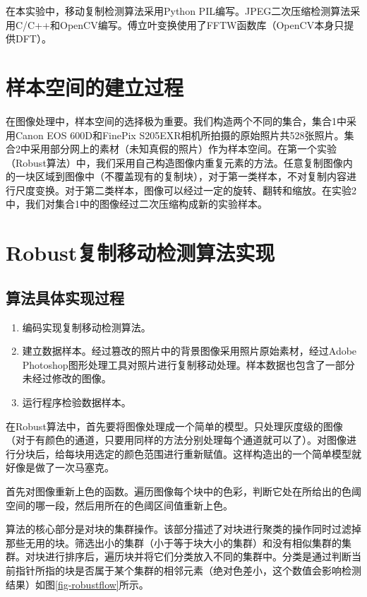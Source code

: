 \documentclass[a4paper, 10pt, notitlepage]{report}
\begin{document}
		在本实验中，移动复制检测算法采用Python PIL编写。JPEG二次压缩检测算法采用C/C++和OpenCV编写。傅立叶变换使用了FFTW函数库（OpenCV本身只提供DFT）。

	\section{样本空间的建立过程}
		在图像处理中，样本空间的选择极为重要。我们构造两个不同的集合，集合1中采用Canon EOS 600D和FinePix S205EXR相机所拍摄的原始照片共528张照片。集合2中采用部分网上的素材（未知真假的照片）作为样本空间。在第一个实验（Robust算法）中，我们采用自己构造图像内重复元素的方法。任意复制图像内的一块区域到图像中（不覆盖现有的复制块），对于第一类样本，不对复制内容进行尺度变换。对于第二类样本，图像可以经过一定的旋转、翻转和缩放。在实验2中，我们对集合1中的图像经过二次压缩构成新的实验样本。

	\section{Robust复制移动检测算法实现}
		\subsection{算法具体实现过程}
			\begin{enumerate}\setlength{\itemsep}{-0.1cm}
				\item 编码实现复制移动检测算法。
				\item 建立数据样本。经过篡改的照片中的背景图像采用照片原始素材，经过Adobe Photoshop图形处理工具对照片进行复制移动处理。样本数据也包含了一部分未经过修改的图像。
				\item 运行程序检验数据样本。
			\end{enumerate}

在Robust算法中，首先要将图像处理成一个简单的模型。只处理灰度级的图像（对于有颜色的通道，只要用同样的方法分别处理每个通道就可以了）。对图像进行分块后，给每块用选定的颜色范围进行重新赋值。这样构造出的一个简单模型就好像是做了一次马塞克。

首先对图像重新上色的函数。遍历图像每个块中的色彩，判断它处在所给出的色阈空间的哪一段，然后用所在的色阈区间值重新上色。

算法的核心部分是对块的集群操作。该部分描述了对块进行聚类的操作同时过滤掉那些无用的块。筛选出小的集群（小于等于块大小的集群）和没有相似集群的集群。对块进行排序后，遍历块并将它们分类放入不同的集群中。分类是通过判断当前指针所指的块是否属于某个集群的相邻元素（绝对色差小，这个数值会影响检测结果）如图\ref{fig-robustflow}所示。
\end{document}
